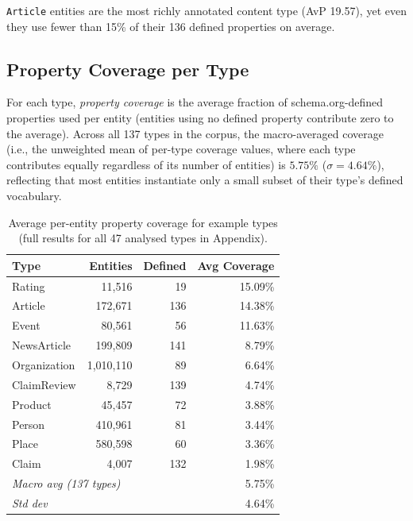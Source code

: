 \documentclass[11pt,a4paper]{article}
\begin{document}
\texttt{Article} entities are the most richly annotated content type (AvP 19.57),
yet even they use fewer than 15\% of their 136 defined properties on average.

\subsection{Property Coverage per Type}

For each type, \emph{property coverage} is the average fraction of
schema.org-defined properties used per entity (entities using no
defined property contribute zero to the average). Across all 137
types in the corpus, the macro-averaged coverage (i.e., the unweighted mean of per-type coverage values, where each type contributes equally regardless of its number of entities) is $5.75\%$
($\sigma = 4.64\%$), reflecting that most entities instantiate only
a small subset of their type's defined vocabulary.

\begin{table}[H]
\centering
\caption{Average per-entity property coverage for example types (full results for all 47 analysed types in Appendix).}
\label{tab:prop_cov}
\begin{tabular}{lrrr}
\toprule
\textbf{Type} & \textbf{Entities} & \textbf{Defined} & \textbf{Avg Coverage} \\
\midrule
Rating        &     11{,}516 &  19 & 15.09\% \\
Article       &    172{,}671 & 136 & 14.38\% \\
Event         &     80{,}561 &  56 & 11.63\% \\
NewsArticle   &    199{,}809 & 141 &  8.79\% \\
Organization  & 1{,}010{,}110 &  89 &  6.64\% \\
ClaimReview   &      8{,}729 & 139 &  4.74\% \\
Product       &     45{,}457 &  72 &  3.88\% \\
Person        &    410{,}961 &  81 &  3.44\% \\
Place         &    580{,}598 &  60 &  3.36\% \\
Claim         &      4{,}007 & 132 &  1.98\% \\
\midrule
\multicolumn{3}{l}{\textit{Macro avg (137 types)}} & 5.75\% \\
\multicolumn{3}{l}{\textit{Std dev}} & 4.64\% \\
\bottomrule
\end{tabular}
\end{table}
\end{document}
